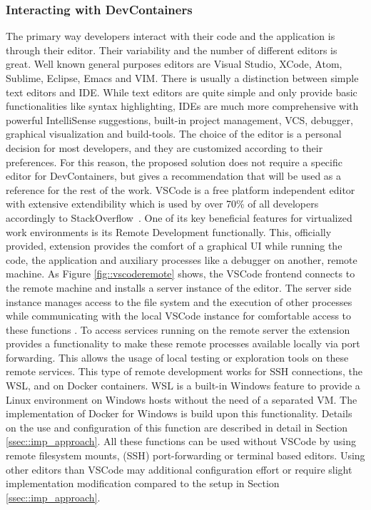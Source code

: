 \documentclass[12pt, a4paper]{article}
\begin{document}
        \subsubsection{Interacting with DevContainers}
        The primary way developers interact with their code and the application is through their editor. Their variability and the number of different editors is great. Well known general purposes editors are Visual Studio, XCode, Atom, Sublime, Eclipse, Emacs and VIM. There is usually a distinction between simple text editors and \acl{IDE}. While text editors are quite simple and only provide basic functionalities like syntax highlighting, \ac{IDE}s are much more comprehensive with powerful IntelliSense suggestions, built-in project management, \ac{VCS}, debugger, graphical visualization and build-tools. The choice of the editor is a personal decision for most developers, and they are customized according to their preferences. For this reason, the proposed solution does not require a specific editor for DevContainers, but gives a recommendation that will be used as a reference for the rest of the work.\newline
        \ac{VSCode} is a free platform independent editor with extensive extendibility which is used by over 70\% of all developers accordingly to StackOverflow~\cite{stackoverflow2021}. One of its key beneficial features for virtualized work environments is its Remote Development functionally. This, officially provided, extension provides the comfort of a graphical \ac{UI} while running the code, the application and auxiliary processes like a debugger on another, remote machine. As Figure \ref{fig::vscoderemote} shows, the \ac{VSCode} frontend connects to the remote machine and installs a server instance of the editor. The server side instance manages access to the file system and the execution of other processes while communicating with the local \ac{VSCode} instance for comfortable access to these functions \cite{vscodedevcontainer}. To access services running on the remote server the extension provides a functionality to make these remote processes available locally via port forwarding. This allows the usage of local testing or exploration tools on these remote services. This type of remote development works for \ac{SSH} connections, the \ac{WSL}, and on Docker containers. \ac{WSL} is a built-in Windows feature to provide a Linux environment on Windows hosts without the need of a separated \ac{VM}. The implementation of Docker for Windows is build upon this functionality. Details on the use and configuration of this function are described in detail in Section \ref{ssec::imp_approach}. All these functions can be used without \ac{VSCode} by using remote filesystem mounts, (\ac{SSH}) port-forwarding or terminal based editors. Using other editors than \ac{VSCode} may additional configuration effort or require slight implementation modification compared to the setup in Section \ref{ssec::imp_approach}.
\end{document}
